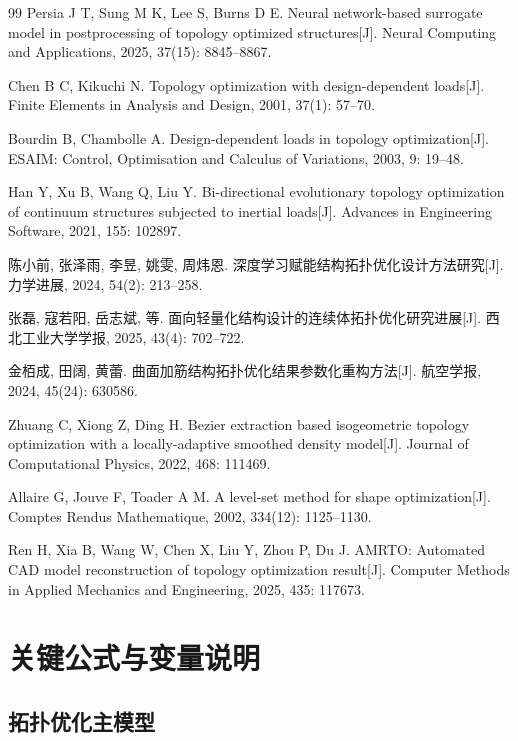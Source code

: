 \documentclass{FRB-style}
\begin{document}
\begin{thebibliography}{99}
Persia J T, Sung M K, Lee S, Burns D E. Neural network-based surrogate model in postprocessing of topology optimized structures[J]. Neural Computing and Applications, 2025, 37(15): 8845--8867.

Chen B C, Kikuchi N. Topology optimization with design-dependent loads[J]. Finite Elements in Analysis and Design, 2001, 37(1): 57--70.

Bourdin B, Chambolle A. Design-dependent loads in topology optimization[J]. ESAIM: Control, Optimisation and Calculus of Variations, 2003, 9: 19--48.

Han Y, Xu B, Wang Q, Liu Y. Bi-directional evolutionary topology optimization of continuum structures subjected to inertial loads[J]. Advances in Engineering Software, 2021, 155: 102897.

陈小前, 张泽雨, 李昱, 姚雯, 周炜恩. 深度学习赋能结构拓扑优化设计方法研究[J]. 力学进展, 2024, 54(2): 213--258.

张磊, 寇若阳, 岳志斌, 等. 面向轻量化结构设计的连续体拓扑优化研究进展[J]. 西北工业大学学报, 2025, 43(4): 702--722.

金栢成, 田阔, 黄蕾. 曲面加筋结构拓扑优化结果参数化重构方法[J]. 航空学报, 2024, 45(24): 630586.

Zhuang C, Xiong Z, Ding H. Bezier extraction based isogeometric topology optimization with a locally-adaptive smoothed density model[J]. Journal of Computational Physics, 2022, 468: 111469.

Allaire G, Jouve F, Toader A M. A level-set method for shape optimization[J]. Comptes Rendus Mathematique, 2002, 334(12): 1125--1130.

Ren H, Xia B, Wang W, Chen X, Liu Y, Zhou P, Du J. AMRTO: Automated CAD model reconstruction of topology optimization result[J]. Computer Methods in Applied Mechanics and Engineering, 2025, 435: 117673.

\end{thebibliography}

\appendix

\section{关键公式与变量说明}

\subsection{拓扑优化主模型}
\end{document}
